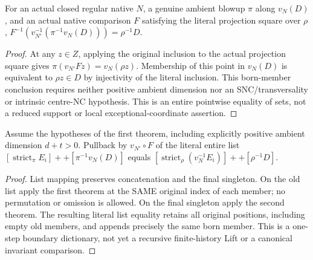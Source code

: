 \begin{theorem}
\label{hir:disjoint-born-exceptional-trace}
\leanok
For an actual closed regular native $N$, a genuine ambient blowup $\pi$
along $v_N(D)$, and an actual native comparison $F$ satisfying the literal
projection square over $\rho$,
$F^{-1}(v_{N'}^{-1}(\pi^{-1}v_N(D)))=\rho^{-1}D$.
\end{theorem}
\begin{proof}
At any $z\in Z$, applying the original inclusion to the actual projection
square gives $\pi(v_{N'}Fz)=v_N(\rho z)$. Membership of this point in $v_N(D)$
is equivalent to $\rho z\in D$ by injectivity of the literal inclusion.
This born-member conclusion requires neither positive ambient dimension
nor an SNC/transversality or intrinsic centre-NC hypothesis.
This is an entire pointwise equality of sets, not a reduced support or local
exceptional-coordinate assertion.
\end{proof}

\begin{theorem}
\label{hir:disjoint-whole-old-born-boundary-trace}
\leanok
Assume the hypotheses of the first theorem, including explicitly
positive ambient dimension $d+t>0$. Pullback by $v_{N'}\circ F$ of the literal entire list
$[\operatorname{strict}_{\pi}E_i]++[\pi^{-1}v_N(D)]$ equals
$[\operatorname{strict}_{\rho}(v_N^{-1}E_i)]++[\rho^{-1}D]$.
\end{theorem}
\begin{proof}
List mapping preserves concatenation and the final singleton. On the old
list apply the first theorem at the SAME original index of each member; no
permutation or omission is allowed. On the final singleton apply the second
theorem. The resulting literal list equality retains all original positions,
including empty old members, and appends precisely the same born member.
This is a one-step boundary dictionary, not yet a recursive finite-history
Lift or a canonical invariant comparison.
\end{proof}
